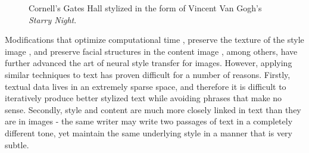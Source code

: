 \documentclass{vldb}
\begin{document}
\begin{figure}[h]
\hspace{0.1cm}
\hspace{0.1cm}
\caption{\textmd{Cornell's Gates Hall stylized in the form of Vincent Van Gogh's \textit{Starry Night}.}}
\end{figure} 

Modifications that optimize computational time \cite{JohnsonAL16}, preserve the texture of the style image \cite{GatysEB15}, and preserve facial structures in the content image \cite{KaurZD17}, among others, have further advanced the art of neural style transfer for images. However, applying similar techniques to text has proven difficult for a number of reasons. Firstly, textual data lives in an extremely sparse space, and therefore it is difficult to iteratively produce better stylized text while avoiding phrases that make no sense. Secondly, style and content are much more closely linked in text than they are in images - the same writer may write two passages of text in a completely different tone, yet maintain the same underlying style in a manner that is very subtle.
\end{document}
